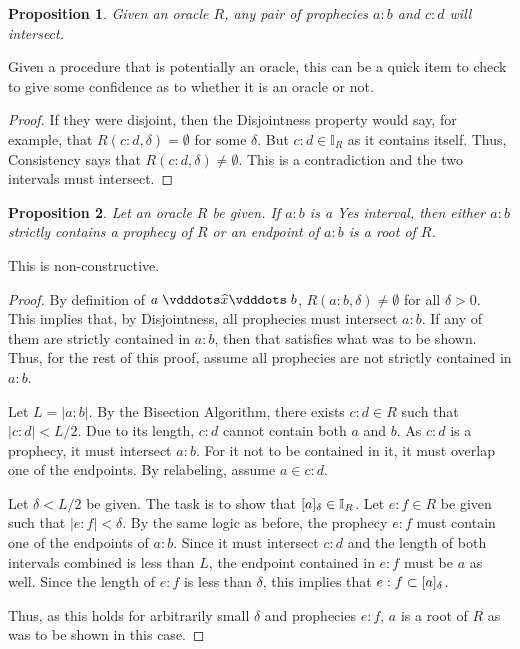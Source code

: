 \documentclass[12pt]{article}
\newtheorem{proposition}{Proposition}[section]
\begin{document}
\begin{proposition}\label{os:prointer}
    Given an oracle $R$, any pair of prophecies $a:b$ and $c:d$ will intersect. 
\end{proposition}

Given a procedure that is potentially an oracle, this can be a quick item to check to give some confidence as to whether it is an oracle or not. 

\begin{proof}
    If they were disjoint, then the Disjointness property would say, for example, that $R(c:d, \delta)= \emptyset$ for some $\delta$. But $c:d \in \mathbb{I}_R$ as it contains itself. Thus, Consistency says that $R(c:d, \delta) \neq \emptyset$. This is a contradiction and the two intervals must intersect. 
\end{proof}

\begin{proposition}\label{os:yescat}
    Let an oracle $R$ be given. If $a:b$ is a Yes interval, then either $a:b$ strictly contains a prophecy of $R$ or an endpoint of $a:b$ is a root of $R$. 
\end{proposition}

This is non-constructive. 

\begin{proof}
    By definition of $a \xora b$, $R(a:b, \delta) \neq \emptyset$ for all $\delta > 0$. This implies that, by Disjointness, all prophecies must intersect $a:b$. If any of them are strictly contained in $a:b$, then that satisfies what was to be shown. Thus, for the rest of this proof, assume all prophecies are not strictly contained in $a:b$.

    Let $L = |a:b|$. By the Bisection Algorithm, there exists $c:d \in R$ such that $|c:d| < L/2$. Due to its length, $c:d$ cannot contain both $a$ and $b$. As $c:d$ is a prophecy, it must intersect $a:b$. For it not to be contained in it, it must overlap one of the endpoints. By relabeling, assume $a \in c:d$.
    
    Let $\delta < L/2$ be given. The task is to show that $[a]_{\delta} \in \mathbb{I}_R$. Let $e:f \in R$ be given such that $|e:f| < \delta$. By the same logic as before, the prophecy $e:f$ must contain one of the endpoints of $a:b$. Since it must intersect $c:d$ and the length of both intervals combined is less than $L$, the endpoint contained in $e:f$ must be $a$ as well. Since the length of $e:f$ is less than $\delta$, this implies that $e:f \subset [a]_{\delta}$.

    Thus, as this holds for arbitrarily small $\delta$ and prophecies $e:f$, $a$ is a root of $R$ as was to be shown in this case. 
\end{proof}
\end{document}
